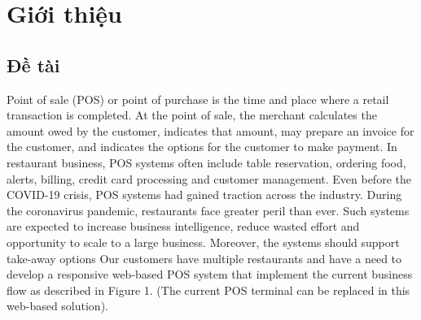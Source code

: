 \documentclass[a4paper]{article}
\begin{document}

\newpage
\begin{center}

\begin{versionhistory}
\end{versionhistory}

\end{center}

\newpage
\tableofcontents


\newpage
\section{Giới thiệu}

\subsection{Đề tài}

Point of sale (POS) or point of purchase is the time and place where a retail transaction is completed. At the point of sale, the merchant calculates the amount owed by the customer, indicates that amount, may prepare an invoice for the customer, and indicates the options for the customer to make payment. In restaurant business, POS systems often include table reservation, ordering food, alerts, billing, credit card processing and customer management. Even before the COVID-19 crisis, POS systems had gained traction across the industry. During the coronavirus pandemic, restaurants face greater peril than ever. Such systems are expected to increase business intelligence, reduce wasted effort and opportunity to scale to a large business. Moreover, the systems should support take-away options Our customers have multiple restaurants and have a need to develop a responsive web-based POS system that implement the current business flow as described in Figure 1. (The current POS terminal can be replaced in this web-based solution).
\end{document}
